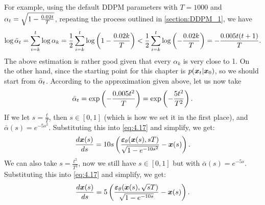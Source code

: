For example, using the default DDPM parameters with $T=1000$ and $\alpha_t=\sqrt{1-\frac{0.02t}{T}}$, repeating the process outlined in \cref{section:DDPM_1}, we have
\begin{equation}
    \label{eq:4.18}
    \log\bar{\alpha}_t=\sum_{i=k}^{t}\log\alpha_k=\frac{1}{2}\sum_{i=k}^{t}\log \left(1-\frac{0.02k}{T}\right)<\frac{1}{2}\sum_{i=k}^{t}\log \left(-\frac{0.02k}{T}\right)=-\frac{0.005t(t+1)}{T}.
\end{equation}
The above estimation is rather good given that every $\alpha_k$ is very close to 1. On the other hand, since the starting point for this chapter is $p(\bm{x}_{t}|\bm{x}_0)$, so we should start from $\bar{\alpha}_t$. According to the approximation given above, let us now take
\begin{equation}\label{eq:4.19}
\bar{\alpha}_t=\exp\left(-\frac{0.005t^2}{T}\right)=\exp\left(-\frac{5t^2}{T^2}\right).
\end{equation}
If we let $s=\frac{t}{T}$, then $s\in[0,1]$ (which is how we set it in the first place), and $\bar{\alpha}(s)=e^{-5s^2}$. Substituting this into \cref{eq:4.17} and simplify, we get:
\begin{equation}
    \label{eq:4.20}
    \frac{d\bm{x}(s)}{ds}=10s\left(\frac{\bm{\varepsilon}_\theta(\bm{x}(s),sT)}{\sqrt{1-e^{-10s^2}}}-\bm{x}(s)\right).
\end{equation}
We can also take $s=\frac{t^2}{T^2}$, now we still have $s\in[0,1]$ but with $\bar{\alpha}(s)=e^{-5s}$. Substituting this into \cref{eq:4.17} and simplify, we get:
\begin{equation}
    \label{eq:4.21}
    \frac{d\bm{x}(s)}{ds}=5\left(\frac{\bm{\varepsilon}_\theta(\bm{x}(s),\sqrt{s}T)}{\sqrt{1-e^{-10s}}}-\bm{x}(s)\right).
\end{equation}